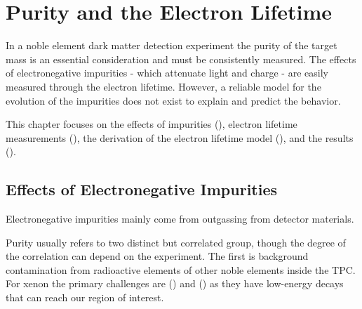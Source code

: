 

\pagestyle{cu}
\graphicspath{{./Chapter5/Figures/}}
\chapter[Purity and the Electron Lifetime][Purity and the Electron Lifetime]{Purity and the Electron Lifetime}
\label{chap:purification}

In a noble element dark matter detection experiment the purity of the target mass is an essential consideration and must be consistently
measured.  The effects of electronegative impurities - which attenuate light and charge - are easily measured through the electron
lifetime.  However, a reliable model for the evolution of the impurities does not exist to explain and predict the behavior.

This chapter focuses on the effects of impurities (), electron lifetime measurements
(), the derivation of the electron lifetime model (), and
the results ().



\section{Effects of Electronegative Impurities}
\label{sec:importance_procedure_effects}
Electronegative impurities mainly come from outgassing from detector materials.

Purity usually refers to two distinct but correlated group, though the degree of the correlation can depend on the
experiment.  The first is background contamination from radioactive elements of other noble elements inside the TPC.  For xenon
the primary challenges are  () and 
() as they have low-energy decays that can reach our region of interest.

